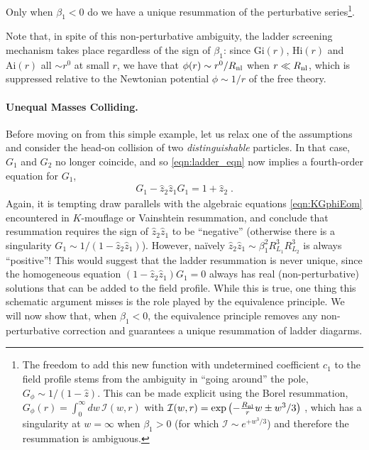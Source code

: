 \documentclass[11pt]{article}
\begin{document}
Only when $\beta_1 < 0$ do we have a unique resummation of the perturbative series\footnote{
The freedom to add this new function with undetermined coefficient $c_1$ to the field profile stems from the ambiguity in ``going around'' the pole, $G_\phi \sim 1/(1-\hat{z})$.
This can be made explicit using the Borel resummation, $G_\phi (r) = \int_0^\infty dw \, \mathcal{I} (w, r)$ with $\mathcal{I} (w, r) = \exp \left( - \frac{R_{\rm nl}}{ r } w \pm w^3/3 \right)$ \cite{Davis:2019ltc}, which has a singularity at $w = \infty$ when $\beta_1 > 0$ (for which $\mathcal{I} \sim e^{+w^3/3}$) and therefore the resummation is ambiguous.  
}. 

Note that, in spite of this non-perturbative ambiguity, the ladder screening mechanism takes place regardless of the sign of $\beta_1$: since $\text{Gi} (r)$, $\text{Hi} (r)$ and $\text{Ai} (r)$ all $\sim r^0$ at small $r$, we have that $\phi (r) \sim r^0/ R_{\rm nl}$ when $r \ll R_{\rm nl}$, which is suppressed relative to the Newtonian potential $\phi \sim 1/r$ of the free theory.  


\paragraph{Unequal Masses Colliding.}
Before moving on from this simple example, let us relax one of the assumptions and consider the head-on collision of two \emph{distinguishable} particles. In that case, $G_1$ and $G_2$ no longer coincide, and so \eqref{eqn:ladder_eqn} now implies a fourth-order equation for $G_1$, 
\begin{align}
G_1 - \hat{z}_2 \hat{z}_1 G_1 = 1 + \hat{z}_2 \; .
\label{eqn:Collision_Eom2}
\end{align}
Again, it is tempting draw parallels with the algebraic equations \eqref{eqn:KGphiEom} encountered in $K$-mouflage or Vainshtein resummation, and conclude that resummation requires the sign of $\hat{z}_2 \hat{z}_1$ to be ``negative'' (otherwise there is a singularity $G_1 \sim 1/(1-\hat{z}_2 \hat{z}_1)$). However, na\"{i}vely $\hat{z}_2 \hat{z}_1 \sim \beta_1^2 R_{L_1}^3 R_{L_2}^3$ is always ``positive''! 
This would suggest that the ladder resummation is never unique, since the homogeneous equation $(1- \hat{z}_2 \hat{z}_1 ) G_1 = 0$ always has real (non-perturbative) solutions that can be added to the field profile.
While this is true, one thing this schematic argument misses is the role played by the equivalence principle. We will now show that, when $\beta_1 < 0$, the equivalence principle removes any non-perturbative correction and guarantees a unique resummation of ladder diagarms.   
\end{document}
